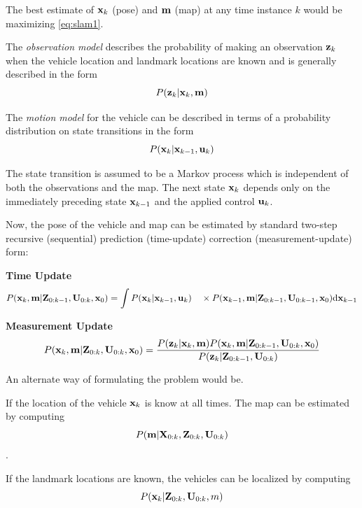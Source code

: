 The best estimate of ${\bf x}_k$ (pose) and ${\bf m}$ (map) at any time instance $k$ would be maximizing \ref{eq:slam1}.

The \textit{observation model} describes the probability of making an observation ${\bf z}_k$ when the vehicle location and landmark locations are known and is generally described in the form
\begin{equation}
P({\bf z}_{k}\vert {\bf x}_{k},{\bf m})
\end{equation}

The\textit{ motion model} for the vehicle can be described in terms of a probability distribution on state transitions in the form
\begin{equation}
P({\bf x}_{k}\vert {\bf x}_{k-1},{\bf u}_{k})
\end{equation}

The state transition is assumed to be a Markov process which is independent of both the observations and the map. The next state ${\bf x}_k$ depends only on the immediately preceding state ${\bf x}_{k-1}$ and the applied control ${\bf u}_k$.

Now, the pose of the vehicle and map can be estimated by standard two-step recursive (sequential) prediction (time-update) correction (measurement-update) form:

\textbf{Time Update}
\begin{equation}
P({\bf x}_{k},{\bf m}\vert {\bf Z}_{0:k-1},{\bf U}_{0:k},{\bf x}_{0})= \int P({\bf x}_{k}\vert {\bf x}_{k-1},{\bf u}_{k}) \quad\times P({\bf x}_{k-1},{\bf m}\vert {\bf Z}_{0:k-1}, {\bf U}_{0:k-1},{\bf x}_{0}){\rm d}{\bf x}_{k-1}
\end{equation}

\textbf{Measurement Update}
\begin{equation}
P({\bf x}_{k},{\bf m}\vert {\bf Z}_{0:k},{\bf U}_{0:k},{\bf x}_{0}) = {P({\bf z}_{k}\vert {\bf x}_{k},{\bf m})P({\bf x}_{k}, {\bf m}\vert {\bf Z}_{0:k-1},{\bf U}_{0:k},{\bf x}_{0})\over P({\bf z}_{k}\vert {\bf Z}_{0:k-1},{\bf U}_{0:k})}
\end{equation}

An alternate way of formulating the problem would be.

If the location of the vehicle ${\bf x}_k$ is know at all times. The map can be estimated by computing
\begin{equation}
P({\bf m}\vert {\bf X}_{0:k},{\bf Z}_{0:k}, {\bf U}_{0:k})
\end{equation}
. 

If the landmark locations are known, the vehicles can be localized by computing
\begin{equation}
P({\bf x}_k\vert {\bf Z}_{0:k},{\bf U}_{0:k}, m)
\end{equation}

